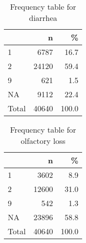 \documentclass[
]{article}
\newenvironment{Shaded}{\begin{snugshade}}{\end{snugshade}}
\newcommand{\DataTypeTok}[1]{\textcolor[rgb]{0.13,0.29,0.53}{#1}}
\newcommand{\DecValTok}[1]{\textcolor[rgb]{0.00,0.00,0.81}{#1}}
\newcommand{\KeywordTok}[1]{\textcolor[rgb]{0.13,0.29,0.53}{\textbf{#1}}}
\newcommand{\NormalTok}[1]{#1}
\newcommand{\OperatorTok}[1]{\textcolor[rgb]{0.81,0.36,0.00}{\textbf{#1}}}
\newcommand{\OtherTok}[1]{\textcolor[rgb]{0.56,0.35,0.01}{#1}}
\newcommand{\StringTok}[1]{\textcolor[rgb]{0.31,0.60,0.02}{#1}}
\begin{document}
\begin{table}[!h]

\caption{\label{tab:unnamed-chunk-64}Frequency table for diarrhea}
\centering
\begin{tabular}[t]{l|r|r}
\hline
  & n & \%\\
\hline
1 & 6787 & 16.7\\
\hline
2 & 24120 & 59.4\\
\hline
9 & 621 & 1.5\\
\hline
NA & 9112 & 22.4\\
\hline
Total & 40640 & 100.0\\
\hline
\end{tabular}
\end{table}

\begin{Shaded}
\end{Shaded}

\begin{table}[!h]

\caption{\label{tab:unnamed-chunk-65}Frequency table for olfactory loss}
\centering
\begin{tabular}[t]{l|r|r}
\hline
  & n & \%\\
\hline
1 & 3602 & 8.9\\
\hline
2 & 12600 & 31.0\\
\hline
9 & 542 & 1.3\\
\hline
NA & 23896 & 58.8\\
\hline
Total & 40640 & 100.0\\
\hline
\end{tabular}
\end{table}
\end{document}
